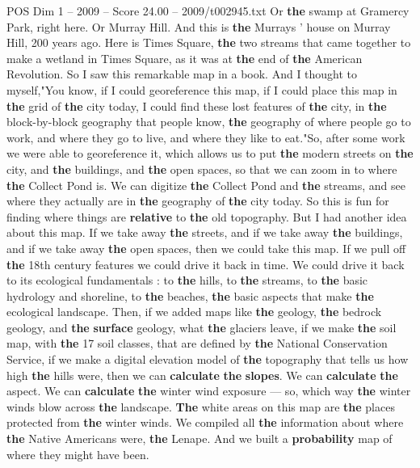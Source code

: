 \begin{textsample}{POS Dim 1 – 2009 – Score 24.00 – 2009/t002945.txt}
Or \textbf{the} swamp at Gramercy Park, right here.
Or Murray Hill.
And this is \textbf{the} Murrays ' house on Murray Hill, 200 years ago.
Here is Times Square, \textbf{the} two streams that came together to make a wetland in Times Square, as it was at \textbf{the} end of \textbf{the} American Revolution.
So I saw this remarkable map in a book.
And I thought to myself,"You know, if I could georeference this map, if I could place this map in \textbf{the} grid of \textbf{the} city today, I could find these lost features of \textbf{the} city, in \textbf{the} block-by-block geography that people know, \textbf{the} geography of where people go to work, and where they go to live, and where they like to eat."So, after some work we were able to georeference it, which allows us to put \textbf{the} modern streets on \textbf{the} city, and \textbf{the} buildings, and \textbf{the} open spaces, so that we can zoom in to where \textbf{the} Collect Pond is.
We can digitize \textbf{the} Collect Pond and \textbf{the} streams, and see where they actually are in \textbf{the} geography of \textbf{the} city today.
So this is fun for finding where things are \textbf{relative} to \textbf{the} old topography.
But I had another idea about this map.
If we take away \textbf{the} streets, and if we take away \textbf{the} buildings, and if we take away \textbf{the} open spaces, then we could take this map.
If we pull off \textbf{the} 18th century features we could drive it back in time.
We could drive it back to its ecological fundamentals : to \textbf{the} hills, to \textbf{the} streams, to \textbf{the} basic hydrology and shoreline, to \textbf{the} beaches, \textbf{the} basic aspects that make \textbf{the} ecological landscape.
Then, if we added maps like \textbf{the} geology, \textbf{the} bedrock geology, and \textbf{the} \textbf{surface} geology, what \textbf{the} glaciers leave, if we make \textbf{the} soil map, with \textbf{the} 17 soil classes, that are defined by \textbf{the} National Conservation Service, if we make a digital elevation model of \textbf{the} topography that tells us how high \textbf{the} hills were, then we can \textbf{calculate} \textbf{the} \textbf{slopes}.
We can \textbf{calculate} \textbf{the} aspect.
We can \textbf{calculate} \textbf{the} winter wind exposure — so, which way \textbf{the} winter winds blow across \textbf{the} landscape. \textbf{The} white areas on this map are \textbf{the} places protected from \textbf{the} winter winds.
We compiled all \textbf{the} information about where \textbf{the} Native Americans were, \textbf{the} Lenape.
And we built a \textbf{probability} map of where they might have been.

\end{textsample}
